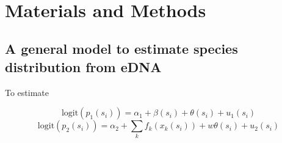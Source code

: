 \documentclass[12pt]{article}
\begin{document}
\begin{linenumbers}
\ \\

\section{Materials and Methods}


\subsection{A general model to estimate species distribution from eDNA}
To estimate 

\[
\mathrm{logit}(p_{1}(s_{i})) = \alpha_{1} + \beta(s_{i}) + \theta(s_{i}) + u_{1}(s_{i})
\]
\[
\mathrm{logit}(p_{2}(s_{i})) = \alpha_{2} + \sum_{k}f_{k}(x_{k}(s_{i})) + w \theta(s_{i}) + u_{2}(s_{i})
\]


\end{linenumbers}
\end{document}
